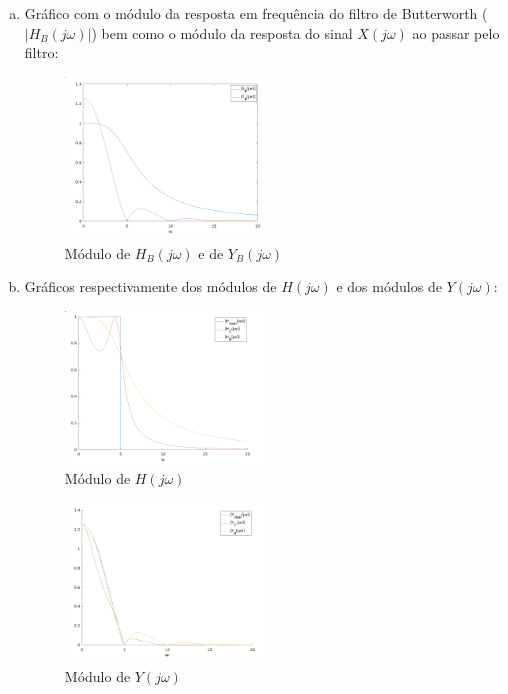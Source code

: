 \documentclass{article}
\begin{document}
\begin{enumerate}[(a)]
\item

    Gráfico com o módulo da resposta em frequência do filtro de Butterworth ($|H_B(j\omega)|$) bem como o módulo da resposta do sinal $X(j\omega)$ ao passar pelo filtro:

 \begin{figure}[H]
 \centering
 \includegraphics[width=0.5\textwidth]{images/hbyb.png}
     \caption{Módulo de $H_B(j\omega)$ e de $Y_B(j\omega)$}
 \end{figure}

\break\vfill

\item

    Gráficos respectivamente dos módulos de $H(j\omega)$ e dos módulos de $Y(j\omega)$:

 \begin{figure}[H]
 \centering
 \includegraphics[width=0.5\textwidth]{images/hhchb.png}
     \caption{Módulo de $H(j\omega)$}
 \end{figure}

 \begin{figure}[H]
 \centering
 \includegraphics[width=0.5\textwidth]{images/yycyb.png}
     \caption{Módulo de $Y(j\omega)$}
 \end{figure}


\end{enumerate}
\end{document}
